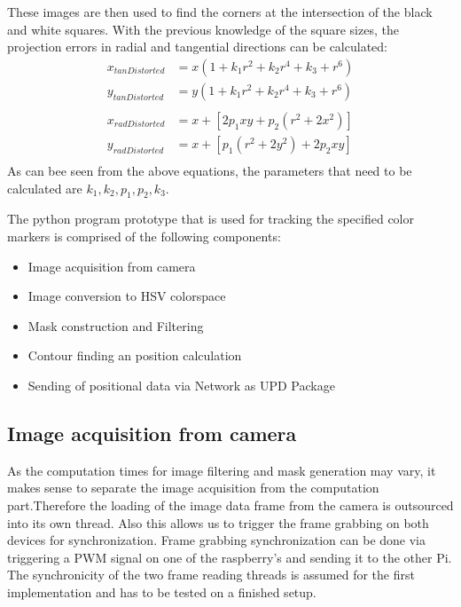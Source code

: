 These images are then used to find the corners at the intersection of the black and white squares. With the previous knowledge of the square sizes, the projection errors in radial and tangential directions can be calculated:
\begin{equation}
\begin{split}
x_{tanDistorted}&=x(1+k_{1}r^{2}+k_{2}r^{4}+k_{3}+r^{6})\\
y_{tanDistorted}&=y(1+k_{1}r^{2}+k_{2}r^{4}+k_{3}+r^{6})\\
\\
x_{radDistorted}&=x+[2p_{1}xy+p_{2}(r^{2}+2x^{2})]\\
y_{radDistorted}&=x+[p_{1}(r^{2}+2y^{2})+2p_{2}xy]\\
\end{split}
\end{equation} 
As can bee seen from the above equations, the parameters that need to be calculated are $k_{1},k_{2},p_{1},p_{2},k_{3}$.

The python program prototype that is used for tracking the specified color markers is comprised of the following components:
\begin{itemize}
\item Image acquisition from camera
\item Image conversion to HSV colorspace
\item Mask construction and Filtering
\item Contour finding an position calculation
\item Sending of positional data via Network as UPD Package
\end{itemize}
\subsection{Image acquisition from camera}
As the computation times for image filtering and mask generation may vary, it makes sense to separate the image acquisition from the computation part.Therefore the loading of the image data frame from the camera is outsourced into its own thread. Also this allows us to trigger the frame grabbing on both devices for synchronization. Frame grabbing synchronization can be done via triggering a PWM signal on one of the raspberry's and sending it to the other Pi.
The synchronicity of the two frame reading threads is assumed for the first implementation and has to be tested on a finished setup.

